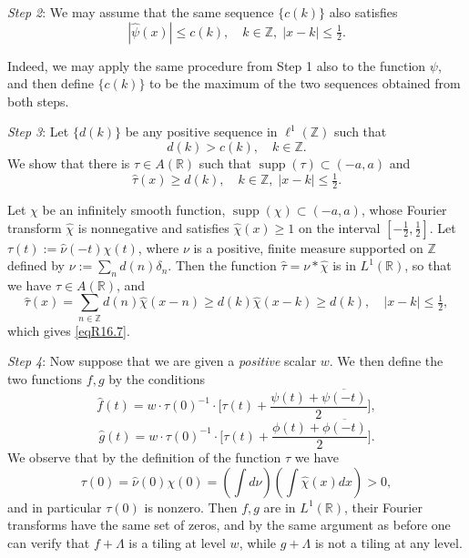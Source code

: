 \documentclass[reqno,a4paper,12pt]{amsart}
\numberwithin{equation}{section}
\numberwithin{figure}{section}
\newcommand\R{\mathbb{R}}
\newcommand\Z{\mathbb{Z}}
\newcommand\1{\mathds{1}}
\renewcommand\leq{\leqslant}
\renewcommand\geq{\geqslant}
\newcommand\sbt{\subset}
\newcommand{\ft}[1]{\widehat{#1}}
\newcommand{\supp}{\operatorname{supp}}
\newcommand{\half}{\tfrac{1}{2}}
\theoremstyle{plain}
\theoremstyle{definition}
\begin{document}
\emph{Step 2}: We may assume that the same sequence
 $\{c(k)\}$ also satisfies
 \begin{equation}
\label{eqR16.6}
|\ft{\psi}(x)| \leq c(k), \quad k \in \Z, \; |x - k| \leq \half.
 \end{equation}

Indeed, we may apply the same procedure from Step 1 
also to the function $\psi$, and then define $\{c(k)\}$
to be the maximum of the
two sequences obtained from both steps.


\emph{Step 3}: Let  $\{d(k)\}$ be any positive sequence
in $\ell^1(\Z)$ such that
 \begin{equation}
\label{eqR16.12}
 d(k) >  c(k), \quad k \in \Z.
 \end{equation}
We show that there is 
$\tau \in A(\R)$ such that
$\supp(\tau) \sbt (-a,a)$ and
 \begin{equation}
\label{eqR16.7}
\ft{\tau}(x) \geq d(k), \quad k \in \Z, \; |x - k| \leq \half.
 \end{equation}


Let $\chi$ be an infinitely smooth
function, $\supp(\chi) \sbt
(-a,a)$, whose
Fourier transform $\ft{\chi}$ is  nonnegative 
and satisfies $\ft{\chi}(x)\geq 1$ on the interval
$[-\half, \half]$. 
Let $\tau(t) := \ft{\nu}(-t) \chi(t)$,
where $\nu$ is  a positive, finite measure supported on $\Z$ 
defined by 
$\nu := \sum_n d(n)\delta_n$. 
Then the function $\ft{\tau} = \nu \ast \ft{\chi}$ is in $L^1(\R)$,
so that we have $\tau \in A(\R)$, and
\[
\ft{\tau}(x)  = \sum_{n \in \Z} d(n) \ft{\chi}(x-n)
\geq  d(k) \ft{\chi}(x-k) \geq d(k),
\quad |x-k| \leq \half,
\]
which gives \eqref{eqR16.7}.



\emph{Step 4}: Now suppose that we are given a \emph{positive} scalar $w$.
We  then define the two functions $f,g$ by the conditions
 \begin{equation}
\label{eqR16.17}
\ft{f}(t) = w \cdot \tau(0)^{-1} \cdot \Big[ \tau(t) +  \frac{\psi(t) + \overline{\psi(-t)}}{2} \Big],
 \end{equation}
 \begin{equation}
\label{eqR16.18}
\ft{g}(t) = w \cdot \tau(0)^{-1} \cdot \Big[ \tau(t) +  \frac{\phi(t) + \overline{\phi(-t)}}{2} \Big].
 \end{equation}
We observe that by the definition of the function $\tau$ we have
\[
\textstyle
\tau(0) = \ft{\nu}(0) \chi(0) = (\int d\nu)(\int \ft{\chi}(x) dx) > 0,
\]
and in particular $\tau(0)$ is nonzero. 
Then $f,g$ are in $L^1(\R)$, their
Fourier transforms have the same set of zeros,
and by the same argument as before one can
verify that  $f + \Lambda$ is a tiling at level $w$,
while $g + \Lambda$ is not a tiling at any level.
\end{document}
